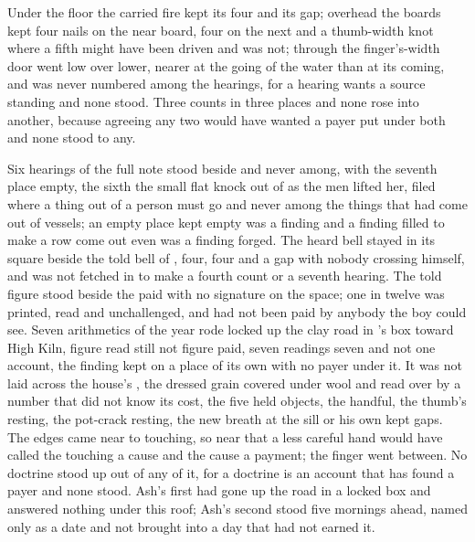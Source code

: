 \scenebreak

Under the floor the carried fire kept its four and its gap; overhead the boards kept four nails on the near board, four on the next and a thumb-width knot where a fifth might have been driven and was not; through the finger's-width door  went low over lower, nearer at the going of the water than at its coming, and was never numbered among the hearings, for a hearing wants a source standing and none stood. Three counts in three places and none rose into another, because agreeing any two would have wanted a payer put under both and none stood to any.

Six hearings of the full note stood beside and never among, with the seventh place empty, the sixth the small flat knock out of  as the men lifted her, filed where a thing out of a person must go and never among the things that had come out of vessels; an empty place kept empty was a finding and a finding filled to make a row come out even was a finding forged. The heard bell stayed in its square beside the told bell of , four, four and a gap with nobody crossing himself, and was not fetched in to make a fourth count or a seventh hearing. The told figure stood beside the paid with no signature on the space; one in twelve was printed, read and unchallenged, and had not been paid by anybody the boy could see. Seven arithmetics of the year rode locked up the clay road in 's box toward High Kiln, figure read still not figure paid, seven readings seven and not one account, the finding kept on a place of its own with no payer under it. It was not laid across the house's , the dressed grain covered under wool and read over by a number that did not know its cost, the five held objects, the handful, the thumb's resting, the pot-crack resting, the new breath at the sill or his own kept gaps. The edges came near to touching, so near that a less careful hand would have called the touching a cause and the cause a payment; the finger went between. No doctrine stood up out of any of it, for a doctrine is an account that has found a payer and none stood. Ash's first had gone up the road in a locked box and answered nothing under this roof; Ash's second stood five mornings ahead, named only as a date and not brought into a day that had not earned it.

